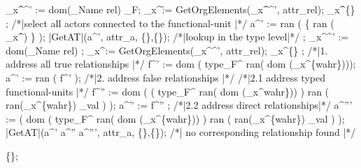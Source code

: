 {\begin{algorithm}[GetAT]
\begin{program}
			{\rel_x^\f}^{'} := dom(\rel_{Name} \rhd rel) \cap \relmengebenutzerinstOE_F; \label{alg:GetAT:FF}
			\rel_x^\f := GetOrgElements({\rel_x^\f}^{'}, attr_{rel});
			\IF \rel_x^\f \neq \{\}
			\THEN
				\var {};
				/*|select all actors connected to the functional-unit |*/
				a^{'} := ran \left( \{ ran \left( \rel_x^\f \right) \} \lhd \relstrukturFA \right);
				\RETURN \quad |GetAT|(a^{'}, attr_a, \{\},\{\});
			\ELSE /*|lookup in the  type level|*/
			\var {};
			{\rel_x^\ftyp}^{'} := dom(\rel_{Name} \rhd rel) \cap \typbenutzerrelationenmenge; \label{alg:GetAT:FtFt}
			\rel_x^\ftyp := GetOrgElements({\rel_x^\ftyp}^{'}, attr_{rel});
			\IF \rel_x^\ftyp \neq \{\}
			\THEN
				\var {};
				/*|1. address all true relationships |*/ \label{alg:GetAT:PraedikateStart} \label{alg:GetAT:WahrePraedikate}
				f^{'} := dom \bigl( type_F^{\typsymbol} \rhd ran( dom (\rel_x^\ftyp \rhd \{wahr\}))\bigr);
				a^{'} := ran \bigl( f^{'} \lhd \relstrukturFA \bigr);
				/*|2. address false relationships |*/\label{alg:GetAT:NichtWahrePraedikate}
				/*|2.1 address typed functional-units |*/
				f^{''} := dom \bigl( \bigl( type_F^{\typsymbol} \rhd ran( dom (\rel_x^\ftyp \rrhd wahr\})) \bigr)
				\cap
				ran \bigl( ran(\rel_x^\ftyp \rrhd \{wahr\}) \lhd \rel_{val} \bigr) \bigr);
				a^{''} := f^{''} \lhd \relstrukturFA;
				/*|2.2 address direct relationships|*/
			a^{'''} :=
				\bigl( dom \bigl( type_F^{\typsymbol} \rhd ran( dom (\rel_x^\ftyp \rrhd \{wahr\})) \lhd \relstrukturFA \bigr)
				  \cap ran \bigl(  ran(\rel_x^\ftyp \rrhd \{wahr\}) \lhd \rel_{val} \bigr) \bigr);
				\RETURN \quad |GetAT|(a^{'} \cup a^{''} \cup a^{'''}, attr_a, \{\},\{\}); \label{alg:GetAT:PraedikateStop}
			\ELSE
				/*| no corresponding relationship found |*/

				\RETURN \quad \{\};
			\FI
		\FI
	\FI
	\FI
	\END
	\end{program}
	\end{algorithm}
	\NumberProgramsfalse
	}

